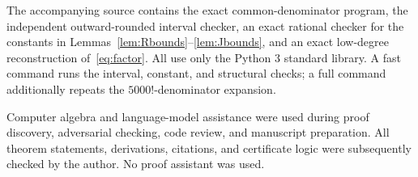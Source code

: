 \documentclass[11pt]{amsart}
\theoremstyle{remark}
\begin{document}
The accompanying source contains the exact common-denominator program, the
independent outward-rounded interval checker, an exact rational checker for
the constants in Lemmas~\ref{lem:Rbounds}--\ref{lem:Jbounds}, and an exact
low-degree reconstruction of~\eqref{eq:factor}. All use only the Python 3
standard library. A fast command runs the interval, constant, and structural
checks; a full command additionally repeats the \(5000!\)-denominator
expansion.

Computer algebra and language-model assistance were used during proof
discovery, adversarial checking, code review, and manuscript preparation.
All theorem statements, derivations, citations, and certificate logic were
subsequently checked by the author. No proof assistant was used.



\end{document}
